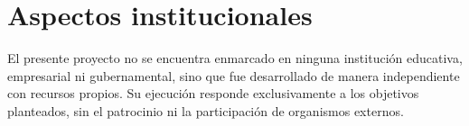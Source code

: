 \section{Aspectos institucionales}
\justifying

El presente proyecto no se encuentra enmarcado en ninguna institución educativa, empresarial ni gubernamental, sino que fue desarrollado de manera independiente con recursos propios. Su ejecución responde exclusivamente a los objetivos planteados, sin el patrocinio ni la participación de organismos externos.